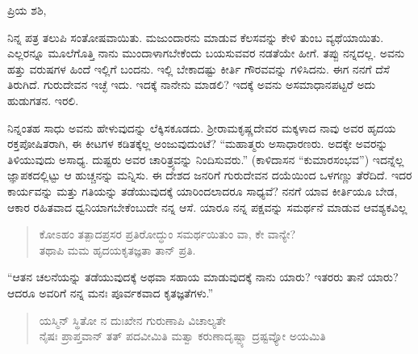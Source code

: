 \vspace{-0.5cm}

\noindent
ಪ್ರಿಯ ಶಶಿ,

ನಿನ್ನ ಪತ್ರ ತಲುಪಿ ಸಂತೋಷವಾಯಿತು. ಮಜುಂದಾರನು ಮಾಡುವ ಕೆಲಸವನ್ನು ಕೇಳಿ ತುಂಬ ವ್ಯಥೆಯಾಯಿತು. ಎಲ್ಲರನ್ನೂ ಮೂಲೆಗೊತ್ತಿ ನಾನು ಮುಂದಾಳಾಗಬೇಕೆಂದು ಬಯಸುವವರ ನಡತೆಯೇ ಹೀಗೆ. ತಪ್ಪು ನನ್ನದಲ್ಲ. ಅವನು ಹತ್ತು ವರುಷಗಳ ಹಿಂದೆ ಇಲ್ಲಿಗೆ ಬಂದನು. ಇಲ್ಲಿ ಬೇಕಾದಷ್ಟು ಕೀರ್ತಿ ಗೌರವವನ್ನು ಗಳಿಸಿದನು. ಈಗ ನನಗೆ ದೆಸೆ ತಿರುಗಿದೆ. ಗುರುದೇವನ ಇಚ್ಛೆ ಇದು. ಇದಕ್ಕೆ ನಾನೇನು ಮಾಡಲಿ? ಇದಕ್ಕೆ ಅವನು ಅಸಮಾಧಾನಪಟ್ಟರೆ ಅದು ಹುಡುಗತನ. ಇರಲಿ.
\begin{verse}
\fontsize{11.5pt}{11pt}
\end{verse}

ನಿನ್ನಂತಹ ಸಾಧು ಅವನು ಹೇಳುವುದನ್ನು ಲೆಕ್ಕಿಸಕೂಡದು. ಶ‍್ರೀರಾಮಕೃಷ್ಣದೇವರ ಮಕ್ಕಳಾದ ನಾವು ಅವರ ಹೃದಯ ರಕ್ತಪೋಷಿತರಾಗಿ, ಈ ಕೀಟಗಳ ಕಡಿತಕ್ಕೆಲ್ಲ ಅಂಜುವು\break ದುಂಟೆ? “ಮಹಾತ್ಮರು ಅಸಾಧಾರಣರು. ಅದಕ್ಕೇ ಅವರನ್ನು ತಿಳಿಯುವುದು ಅಸಾಧ್ಯ. ದುಷ್ಟರು ಅವರ ಚಾರಿತ್ರ್ಯವನ್ನು ನಿಂದಿಸುವರು.” (ಕಾಳಿದಾಸನ “ಕುಮಾರಸಂಭವ”) ಇದನ್ನೆಲ್ಲ ಜ್ಞಾಪಕದಲ್ಲಿಟ್ಟು ಆ ಹುಚ್ಚನನ್ನು ಮನ್ನಿಸು. ಈ ದೇಶದ ಜನರಿಗೆ ಗುರುದೇವನ ದಯೆಯಿಂದ ಒಳಗಣ್ಣು ತೆರೆದಿದೆ. ಇದರ ಕಾರ್ಯವನ್ನು ಮತ್ತು ಗತಿಯನ್ನು ತಡೆಯುವುದಕ್ಕೆ ಯಾರಿಂದಲಾದರೂ ಸಾಧ್ಯವೆ? ನನಗೆ ಯಾವ ಕೀರ್ತಿಯೂ ಬೇಡ, ಆಕಾರ ರಹಿತವಾದ ಧ್ವನಿಯಾಗಬೇಕೆಂಬುದೇ ನನ್ನ ಆಸೆ. ಯಾರೂ ನನ್ನ ಪಕ್ಷವನ್ನು ಸಮರ್ಥನೆ ಮಾಡುವ ಆವಶ್ಯಕವಿಲ್ಲ\enginline{-}

\vspace{-0.5cm}

\begin{verse}
 ಕೋಽಹಂ ತತ್ಪಾದಪ್ರಸರ ಪ್ರತಿರೋದ್ಧುಂ ಸಮರ್ಥಯಿತುಂ ವಾ, ಕೇ ವಾನ್ಯೇ?\\
 ತಥಾಪಿ ಮಮ ಹೃದಯಕೃತಜ್ಞತಾ ತಾನ್ ಪ್ರತಿ.
\end{verse}

\vspace{-0.5cm}

“ಆತನ ಚಲನೆಯನ್ನು ತಡೆಯುವುದಕ್ಕೆ ಅಥವಾ ಸಹಾಯ ಮಾಡುವುದಕ್ಕೆ ನಾನು ಯಾರು? ಇತರರು ತಾನೆ ಯಾರು? ಆದರೂ ಅವರಿಗೆ ನನ್ನ ಮನಃ ಪೂರ್ವಕವಾದ ಕೃತಜ್ಞತೆಗಳು.”

\vspace{-0.5cm}

\begin{verse}
 ಯಸ್ಮಿನ್ ಸ್ಥಿತೋ ನ ದುಃಖೇನ ಗುರುಣಾಪಿ ವಿಚಾಲ್ಯತೇ\enginline{-}\\
 ನೈಷಃ ಪ್ರಾಪ್ತವಾನ್ ತತ್ ಪದವೀಮಿತಿ ಮತ್ವಾ ಕರುಣಾದೃಷ್ಟ್ಯಾ ದ್ರಷ್ಟವ್ಯೋ ಅಯಮಿತಿ
\end{verse}

